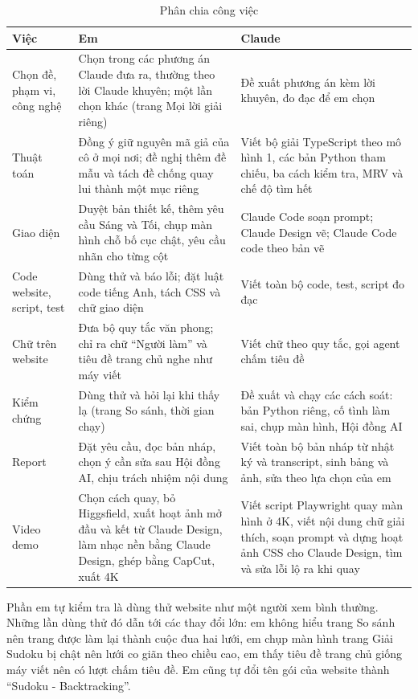 \begin{table}[H]
  \centering
  \caption{Phân chia công việc}
  \label{tab:roles}
  \begin{tabularx}{\linewidth}{@{}>{\raggedright\arraybackslash}p{3.4cm}LL@{}}
    \toprule
    \textbf{Việc} & \textbf{Em} & \textbf{Claude} \\
    \midrule
    Chọn đề, phạm vi, công nghệ & Chọn trong các phương án Claude đưa ra, thường theo lời Claude khuyên; một lần chọn khác (trang Mọi lời giải riêng) & Đề xuất phương án kèm lời khuyên, đo đạc để em chọn \\
    Thuật toán & Đồng ý giữ nguyên mã giả của cô ở mọi nơi; đề nghị thêm đề mẫu và tách đề chống quay lui thành một mục riêng & Viết bộ giải TypeScript theo mô hình 1, các bản Python tham chiếu, ba cách kiểm tra, MRV và chế độ tìm hết \\
    Giao diện & Duyệt bản thiết kế, thêm yêu cầu Sáng và Tối, chụp màn hình chỗ bố cục chật, yêu cầu nhãn cho từng cột & Claude Code soạn prompt; Claude Design vẽ; Claude Code code theo bản vẽ \\
    Code website, script, test & Dùng thử và báo lỗi; đặt luật code tiếng Anh, tách CSS và chữ giao diện & Viết toàn bộ code, test, script đo đạc \\
    Chữ trên website & Đưa bộ quy tắc văn phong; chỉ ra chữ ``Người làm'' và tiêu đề trang chủ nghe như máy viết & Viết chữ theo quy tắc, gọi agent chấm tiêu đề \\
    Kiểm chứng & Dùng thử và hỏi lại khi thấy lạ (trang So sánh, thời gian chạy) & Đề xuất và chạy các cách soát: bản Python riêng, cố tình làm sai, chụp màn hình, Hội đồng AI \\
    Report & Đặt yêu cầu, đọc bản nháp, chọn ý cần sửa sau Hội đồng AI, chịu trách nhiệm nội dung & Viết toàn bộ bản nháp từ nhật ký và transcript, sinh bảng và ảnh, sửa theo lựa chọn của em \\
    Video demo & Chọn cách quay, bỏ Higgsfield, xuất hoạt ảnh mở đầu và kết từ Claude Design, làm nhạc nền bằng Claude Design, ghép bằng CapCut, xuất 4K & Viết script Playwright quay màn hình ở 4K, viết nội dung chữ giải thích, soạn prompt và dựng hoạt ảnh CSS cho Claude Design, tìm và sửa lỗi lộ ra khi quay \\
    \bottomrule
  \end{tabularx}
\end{table}

Phần em tự kiểm tra là dùng thử website như một người xem bình thường. Những lần dùng thử đó dẫn tới các thay đổi lớn: em không hiểu trang So sánh nên trang được làm lại thành cuộc đua hai lưới, em chụp màn hình trang Giải Sudoku bị chật nên lưới co giãn theo chiều cao, em thấy tiêu đề trang chủ giống máy viết nên có lượt chấm tiêu đề. Em cũng tự đổi tên gói của website thành ``Sudoku - Backtracking''.

